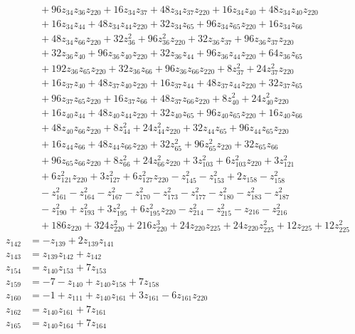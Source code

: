\begin{align*}
&\quad{}+96z_{34} z_{36} z_{220}+16z_{34} z_{37}+48z_{34} z_{37} z_{220}+16z_{34} z_{40}+48z_{34} z_{40} z_{220}\\
&\quad{}+16z_{34} z_{44}+48z_{34} z_{44} z_{220}+32z_{34} z_{65}+96z_{34} z_{65} z_{220}+16z_{34} z_{66}\\
&\quad{}+48z_{34} z_{66} z_{220}+32z_{36}^{2}+96z_{36}^{2} z_{220}+32z_{36} z_{37}+96z_{36} z_{37} z_{220}\\
&\quad{}+32z_{36} z_{40}+96z_{36} z_{40} z_{220}+32z_{36} z_{44}+96z_{36} z_{44} z_{220}+64z_{36} z_{65}\\
&\quad{}+192z_{36} z_{65} z_{220}+32z_{36} z_{66}+96z_{36} z_{66} z_{220}+8z_{37}^{2}+24z_{37}^{2} z_{220}\\
&\quad{}+16z_{37} z_{40}+48z_{37} z_{40} z_{220}+16z_{37} z_{44}+48z_{37} z_{44} z_{220}+32z_{37} z_{65}\\
&\quad{}+96z_{37} z_{65} z_{220}+16z_{37} z_{66}+48z_{37} z_{66} z_{220}+8z_{40}^{2}+24z_{40}^{2} z_{220}\\
&\quad{}+16z_{40} z_{44}+48z_{40} z_{44} z_{220}+32z_{40} z_{65}+96z_{40} z_{65} z_{220}+16z_{40} z_{66}\\
&\quad{}+48z_{40} z_{66} z_{220}+8z_{44}^{2}+24z_{44}^{2} z_{220}+32z_{44} z_{65}+96z_{44} z_{65} z_{220}\\
&\quad{}+16z_{44} z_{66}+48z_{44} z_{66} z_{220}+32z_{65}^{2}+96z_{65}^{2} z_{220}+32z_{65} z_{66}\\
&\quad{}+96z_{65} z_{66} z_{220}+8z_{66}^{2}+24z_{66}^{2} z_{220}+3z_{103}^{2}+6z_{103}^{2} z_{220}+3z_{121}^{2}\\
&\quad{}+6z_{121}^{2} z_{220}+3z_{127}^{2}+6z_{127}^{2} z_{220}-z_{145}^{2}-z_{153}^{2}+2z_{158}-z_{158}^{2}\\
&\quad{}-z_{161}^{2}-z_{164}^{2}-z_{167}^{2}-z_{170}^{2}-z_{173}^{2}-z_{177}^{2}-z_{180}^{2}-z_{183}^{2}-z_{187}^{2}\\
&\quad{}-z_{190}^{2}+z_{193}^{2}+3z_{195}^{2}+6z_{195}^{2} z_{220}-z_{214}^{2}-z_{215}^{2}-z_{216}-z_{216}^{2}\\
&\quad{}+186z_{220}+324z_{220}^{2}+216z_{220}^{3}+24z_{220} z_{225}+24z_{220} z_{225}^{2}+12z_{225}+12z_{225}^{2}\\[3pt]
z_{142}&=-z_{139}+2z_{139} z_{141}\\[3pt]
z_{143}&=z_{139} z_{142}+z_{142}\\[3pt]
z_{154}&=z_{140} z_{153}+7z_{153}\\[3pt]
z_{159}&=-7-z_{140}+z_{140} z_{158}+7z_{158}\\[3pt]
z_{160}&=-1+z_{111}+z_{140} z_{161}+3z_{161}-6z_{161} z_{220}\\[3pt]
z_{162}&=z_{140} z_{161}+7z_{161}\\[3pt]
z_{165}&=z_{140} z_{164}+7z_{164}
\end{align*}
